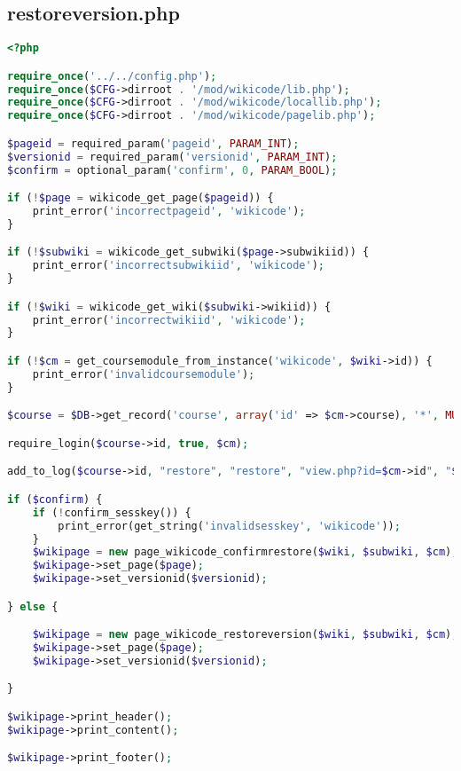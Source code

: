 \subsection{restoreversion.php}
\begin{lstlisting}[language=PHP]
<?php

require_once('../../config.php');
require_once($CFG->dirroot . '/mod/wikicode/lib.php');
require_once($CFG->dirroot . '/mod/wikicode/locallib.php');
require_once($CFG->dirroot . '/mod/wikicode/pagelib.php');

$pageid = required_param('pageid', PARAM_INT);
$versionid = required_param('versionid', PARAM_INT);
$confirm = optional_param('confirm', 0, PARAM_BOOL);

if (!$page = wikicode_get_page($pageid)) {
    print_error('incorrectpageid', 'wikicode');
}

if (!$subwiki = wikicode_get_subwiki($page->subwikiid)) {
    print_error('incorrectsubwikiid', 'wikicode');
}

if (!$wiki = wikicode_get_wiki($subwiki->wikiid)) {
    print_error('incorrectwikiid', 'wikicode');
}

if (!$cm = get_coursemodule_from_instance('wikicode', $wiki->id)) {
    print_error('invalidcoursemodule');
}

$course = $DB->get_record('course', array('id' => $cm->course), '*', MUST_EXIST);

require_login($course->id, true, $cm);

add_to_log($course->id, "restore", "restore", "view.php?id=$cm->id", "$wiki->id");

if ($confirm) {
    if (!confirm_sesskey()) {
        print_error(get_string('invalidsesskey', 'wikicode'));
    }
    $wikipage = new page_wikicode_confirmrestore($wiki, $subwiki, $cm);
    $wikipage->set_page($page);
    $wikipage->set_versionid($versionid);

} else {

    $wikipage = new page_wikicode_restoreversion($wiki, $subwiki, $cm);
    $wikipage->set_page($page);
    $wikipage->set_versionid($versionid);

}

$wikipage->print_header();
$wikipage->print_content();

$wikipage->print_footer();
\end{lstlisting}

